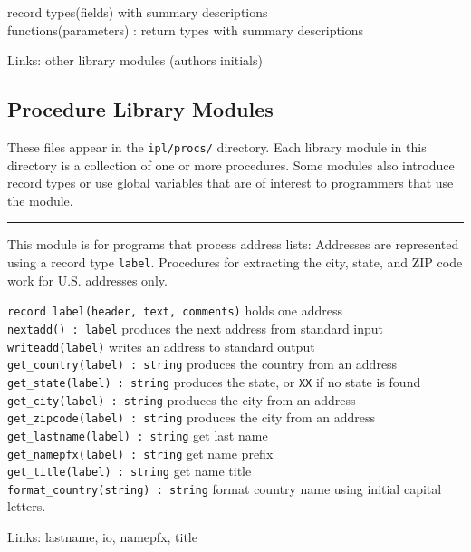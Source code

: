 record types(fields) with summary descriptions\\
functions(parameters) : return types with summary descriptions

Links: other library modules (author{\textquotesingle}s initials)

\subsection{Procedure Library Modules}

These files appear in the \texttt{ipl/procs/} directory. Each library
module in this directory is a collection of one or more procedures.
Some modules also introduce record types or use global variables that
are of interest to programmers that use the module.

\vspace{0.25cm}\hrule{}

This module is for programs that process address lists: Addresses are
represented using a record type \texttt{label}. Procedures for
extracting the city, state, and ZIP code work for U.S. addresses only.

\texttt{record label(header, text, comments)} holds one address\\
\texttt{nextadd() : label} produces the next address from standard
input\\
\texttt{writeadd(label)} writes an address to standard output\\
\texttt{get\_country(label) : string} produces the country from an
address\\
\texttt{get\_state(label) : string} produces the state,
or \texttt{{\textquotedbl}XX{\textquotedbl}} if no state is found\\
\texttt{get\_city(label) : string} produces the city from an address\\
\texttt{get\_zipcode(label) : string} produces the city from an address\\
\texttt{get\_lastname(label) : string} get last name\\
\texttt{get\_namepfx(label) : string} get name prefix\\
\texttt{get\_title(label) : string} get name title\\
\texttt{format\_country(string) : string} format country name using
initial capital letters.

Links: lastname, io, namepfx, title 


